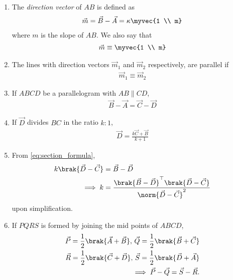 \begin{enumerate}[label=\thesubsection.\arabic*.,ref=\thesubsection.\theenumi]
	\item The {\em direction vector} of $AB$ is defined as
		\begin{align}
		\label{eq:dir-vec}
			\vec{m}=\vec{B}-
			\vec{A} = \kappa
			\myvec{1 \\ m}
		\end{align}
		where $m$ is the slope of $AB$.  We also say that 
\begin{align}
\vec{m}\equiv   \myvec{1 \\ m}
\end{align}
	\item The lines with direction vectors $\vec{m}_1$ and $\vec{m}_2$
		respectively, are parallel if 
\begin{align}
\vec{m}_1\equiv   \vec{m}_2
\end{align}
  \item If $ABCD$ be a parallelogram with $AB \parallel CD$,
	  \label{prop:two-pgm}
  \begin{align}
	  \label{eq:two-pgm}
 \vec{B}-\vec{A} = \vec{C} -\vec{D}
  \end{align}
\item If $\vec{D}$ divides $BC$ in the ratio $k : 1$,
		\begin{align}
			\vec{D}= \frac{k\vec{C}+\vec{B}}{k+1}
	  \label{eq:section_formula}
		\end{align}
	\item 
	  From \eqref{eq:section_formula},
		\begin{align}
			k\brak{\vec{D}-\vec{C}}&= \vec{B}-\vec{D}
			\\
			\implies k &=
			\frac{\brak{\vec{B}-\vec{D}}^{\top}\brak{\vec{D}-\vec{C}}}{\norm{\vec{D}-\vec{C}}^2}
			\label{eq:section_formula-k}
		\end{align}
		upon simplification.
  \item 
If $PQRS$ is formed by joining the mid points of $ABCD$, 
\begin{align}
  \vec{P} = \frac{1}{2}\brak{\vec{A}+\vec{B}} 
  ,\,
 \vec{Q} = \frac{1}{2}\brak{\vec{B}+\vec{C}} 
 \\
 \vec{R} = \frac{1}{2}\brak{\vec{C}+\vec{D}}   
  ,\,
 \vec{S} = \frac{1}{2}\brak{\vec{D}+\vec{A}}  
 \\
	\implies 
 \vec{P}-\vec{Q} = \vec{S} -\vec{R}.
  \label{eq:10/7/4/8det2f}

\end{align}
\end{enumerate}
